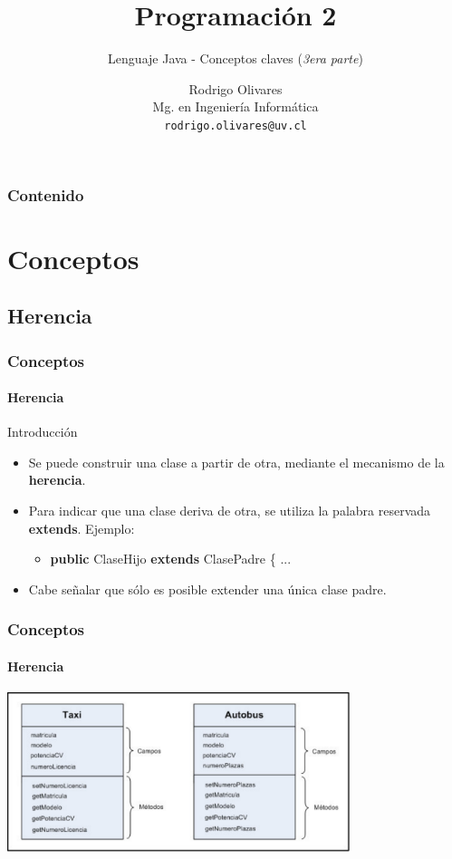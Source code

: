\documentclass{beamer}
\title[\textbf{Programaci\'on 2}]{\textbf{Programaci\'on 2}}
\subtitle{Lenguaje Java - Conceptos claves (\emph{3era parte})}
\author[Rodrigo Olivares]
{
	Rodrigo Olivares \\
	\vspace{0.5mm}
	Mg. en Ingenier\'ia Inform\'atica \\
	\vspace{0.5mm}
	\texttt{\normalsize rodrigo.olivares@uv.cl}
}
\institute[Universidad de Valpara\'iso]
\begin{document}
	\begin{frame}
		\titlepage
	\end{frame}

	\begin{frame}
		\frametitle{Contenido}
		\tableofcontents%
	\end{frame}

	\section{Conceptos}

		\subsection{Herencia}

		\begin{frame}
			\frametitle{Conceptos}
			\framesubtitle{Herencia}

			\begin{block}{Introducci\'on}
				\begin{itemize}
  					\item Se puede construir una clase a partir de otra, mediante el mecanismo de la \textbf{herencia}.
					\item Para indicar que una clase deriva de otra, se utiliza la palabra reservada \textbf{extends}. Ejemplo:
					\begin{itemize}
  						\item \textbf{public} ClaseHijo \textbf{extends} ClasePadre \{ ...
					\end{itemize}
					\item Cabe se\~nalar que s\'olo es posible extender una \'unica clase padre.
				\end{itemize}
			\end{block}
		\end{frame}
		
		\begin{frame}
			\frametitle{Conceptos}
			\framesubtitle{Herencia}
			
			\begin{center}
				\includegraphics[width=10cm]{images/herencia_1.pdf}
			\end{center}
		\end{frame}
\end{document}
